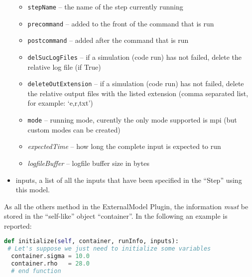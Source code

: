 \begin{itemize}
\begin{itemize}
    \item \texttt{stepName} -- the name of the step currently running
    \item \texttt{precommand} -- added to the front of the command that is run
    \item \texttt{postcommand} -- added after the command that is run
    \item \texttt{delSucLogFiles} -- if a simulation (code run) has not failed,
    delete the relative log file (if True)
    \item \texttt{deleteOutExtension} -- if a simulation (code run) has not
    failed, delete the relative output files with the listed extension (comma
    separated list, for example: `e,r,txt')
    \item \texttt{mode} -- running mode, curently the only mode supported is
      mpi (but custom modes can be created)
    \item \textit{expectedTime} -- how long the complete input is expected to
    run
    \item \textit{logfileBuffer} -- logfile buffer size in bytes
  \end{itemize}
  \item inputs, a list of all the inputs that have been specified in the
  ``Step'' using this model.
\end{itemize}
As all the others method in the ExternalModel Plugin, the information \emph{must} be
stored in the ``self-like'' object ``container''.
In the following an example is reported:
\begin{lstlisting}[language=python]
def initialize(self, container, runInfo, inputs):
 # Let's suppose we just need to initialize some variables
  container.sigma = 10.0
  container.rho   = 28.0
  # end function
\end{lstlisting}
